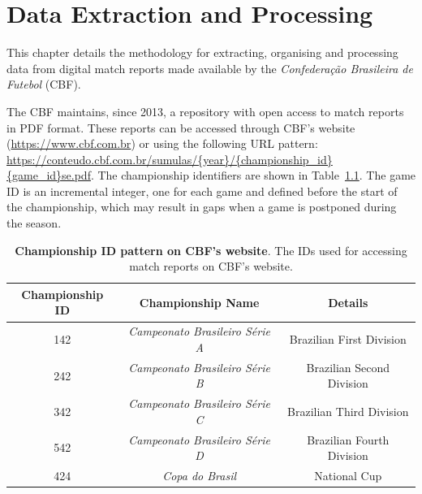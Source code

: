 \chapter{Data Extraction and Processing}
\label{scraping}

This chapter details the methodology for extracting, organising and processing data from digital match reports made available by the \textit{Confederação Brasileira de Futebol} (CBF).

The CBF maintains, since 2013, a repository with open access to match reports in PDF format.
These reports can be accessed through CBF's website (\url{https://www.cbf.com.br}) or using the following URL pattern: \url{https://conteudo.cbf.com.br/sumulas/{year}/{championship_id}{game_id}se.pdf}.
The championship identifiers are shown in Table~\ref{tab:championship_id}.
The game ID is an incremental integer, one for each game and defined before the start of the championship, which may result in gaps when a game is postponed during the season.

\begin{table}[htbp]
    \centering
    \begin{tabular}{ccc}
        \toprule
        Championship ID & Championship Name                      & Details \\
        \midrule
        142             & \textit{Campeonato Brasileiro Série A} & Brazilian First Division \\
        242             & \textit{Campeonato Brasileiro Série B} & Brazilian Second Division \\
        342             & \textit{Campeonato Brasileiro Série C} & Brazilian Third Division \\
        542             & \textit{Campeonato Brasileiro Série D} & Brazilian Fourth Division \\
        424             & \textit{Copa do Brasil}                & National Cup \\
        \bottomrule
    \end{tabular}
    \caption{
        \textbf{Championship ID pattern on CBF's website}.
        The IDs used for accessing match reports on CBF's website.
    }
    \label{tab:championship_id}
\end{table}








